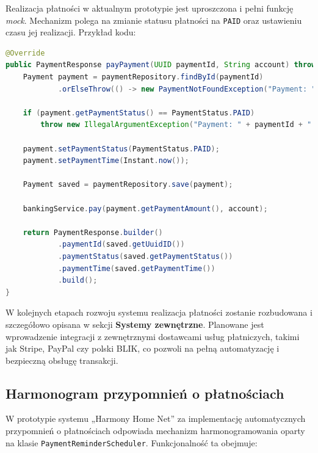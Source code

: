 Realizacja płatności w aktualnym prototypie jest uproszczona i pełni funkcję \emph{mock}. Mechanizm polega na zmianie statusu płatności na \texttt{PAID} oraz ustawieniu czasu jej realizacji. Przykład kodu:

\begin{lstlisting}[language=Java, caption=Fragment metody \texttt{payPayment}]
@Override
public PaymentResponse payPayment(UUID paymentId, String account) throws PaymentNotFoundException {
    Payment payment = paymentRepository.findById(paymentId)
            .orElseThrow(() -> new PaymentNotFoundException("Payment: " + paymentId + " not found"));

    if (payment.getPaymentStatus() == PaymentStatus.PAID)
        throw new IllegalArgumentException("Payment: " + paymentId + " already paid");

    payment.setPaymentStatus(PaymentStatus.PAID);
    payment.setPaymentTime(Instant.now());

    Payment saved = paymentRepository.save(payment);

    bankingService.pay(payment.getPaymentAmount(), account);

    return PaymentResponse.builder()
            .paymentId(saved.getUuidID())
            .paymentStatus(saved.getPaymentStatus())
            .paymentTime(saved.getPaymentTime())
            .build();
}
\end{lstlisting}

W kolejnych etapach rozwoju systemu realizacja płatności zostanie rozbudowana i szczegółowo opisana w sekcji \textbf{Systemy zewnętrzne}. Planowane jest wprowadzenie integracji z zewnętrznymi dostawcami usług płatniczych, takimi jak Stripe, PayPal czy polski BLIK, co pozwoli na pełną automatyzację i bezpieczną obsługę transakcji.

\subsection{Harmonogram przypomnień o płatnościach}

W prototypie systemu „Harmony Home Net” za implementację automatycznych przypomnień o płatnościach odpowiada mechanizm harmonogramowania oparty na klasie \texttt{PaymentReminderScheduler}. Funkcjonalność ta obejmuje:

